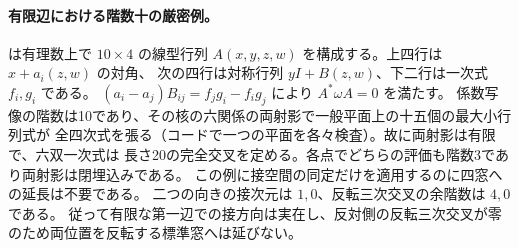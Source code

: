 \paragraph{有限辺における階数十の厳密例。}
 は有理数上で
$10\times4$ の線型行列 $A(x,y,z,w)$ を構成する。上四行は $x+a_i(z,w)$ の対角、
次の四行は対称行列 $yI+B(z,w)$、下二行は一次式 $f_i,g_i$ である。
$(a_i-a_j)B_{ij}=f_jg_i-f_i g_j$ により $A^*\omega A=0$ を満たす。
係数写像の階数は10であり、その核の六関係の両射影で一般平面上の十五個の最大小行列式が
全四次式を張る（コードで一つの平面を各々検査）。故に両射影は有限で、六双一次式は
長さ20の完全交叉を定める。各点でどちらの評価も階数3であり両射影は閉埋込みである。
この例に接空間の同定だけを適用するのに四窓への延長は不要である。
二つの向きの接次元は $1,0$、反転三次交叉の余階数は $4,0$ である。
従って有限な第一辺での接方向は実在し、反対側の反転三次交叉が零のため両位置を反転する標準窓へは延びない。
